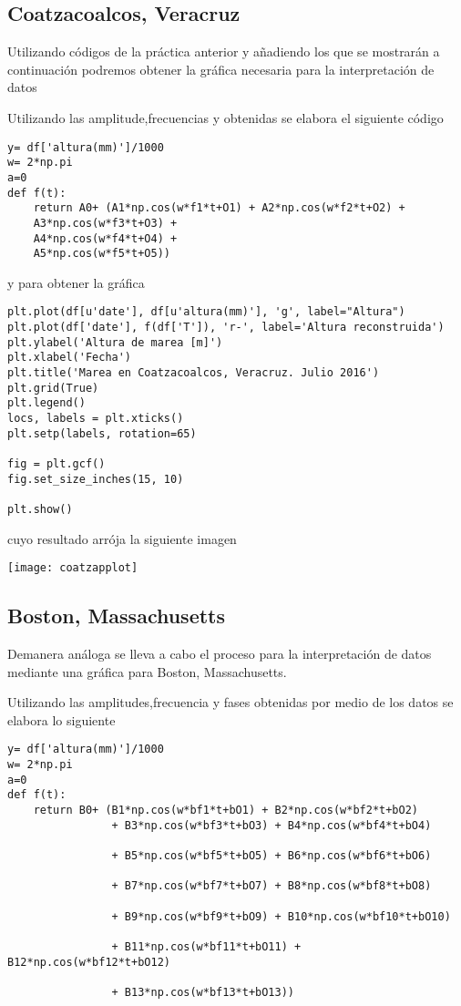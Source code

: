 \documentclass[12pt]{article}
\begin{document}
\subsection*{Coatzacoalcos, Veracruz}
Utilizando códigos de la práctica anterior y añadiendo los que se mostrarán a continuación podremos obtener la gráfica necesaria para la interpretación de datos


Utilizando las amplitude,frecuencias y obtenidas se elabora el siguiente código 

\begin{verbatim}
y= df['altura(mm)']/1000
w= 2*np.pi
a=0
def f(t):
    return A0+ (A1*np.cos(w*f1*t+O1) + A2*np.cos(w*f2*t+O2) +
    A3*np.cos(w*f3*t+O3) +
    A4*np.cos(w*f4*t+O4) +
    A5*np.cos(w*f5*t+O5))
\end{verbatim}

y para obtener la gráfica 

\begin{verbatim}
plt.plot(df[u'date'], df[u'altura(mm)'], 'g', label="Altura")
plt.plot(df['date'], f(df['T']), 'r-', label='Altura reconstruida')
plt.ylabel('Altura de marea [m]')
plt.xlabel('Fecha')
plt.title('Marea en Coatzacoalcos, Veracruz. Julio 2016')
plt.grid(True)
plt.legend()
locs, labels = plt.xticks()
plt.setp(labels, rotation=65)

fig = plt.gcf()
fig.set_size_inches(15, 10)

plt.show()
\end{verbatim}

cuyo resultado arrója la siguiente imagen 

\begin{center}
\texttt{[image: coatzapplot]}
\end{center}


\subsection*{Boston, Massachusetts}

Demanera análoga se lleva a cabo el proceso para la interpretación de datos mediante una gráfica para Boston, Massachusetts.

Utilizando las amplitudes,frecuencia y fases obtenidas por medio de los datos se elabora lo siguiente 

\begin{verbatim}
y= df['altura(mm)']/1000
w= 2*np.pi
a=0
def f(t):
    return B0+ (B1*np.cos(w*bf1*t+bO1) + B2*np.cos(w*bf2*t+bO2) 
                + B3*np.cos(w*bf3*t+bO3) + B4*np.cos(w*bf4*t+bO4)
                
                + B5*np.cos(w*bf5*t+bO5) + B6*np.cos(w*bf6*t+bO6)
                
                + B7*np.cos(w*bf7*t+bO7) + B8*np.cos(w*bf8*t+bO8)
                
                + B9*np.cos(w*bf9*t+bO9) + B10*np.cos(w*bf10*t+bO10)
                
                + B11*np.cos(w*bf11*t+bO11) + B12*np.cos(w*bf12*t+bO12)
                
                + B13*np.cos(w*bf13*t+bO13))
                
\end{verbatim}
\end{document}
